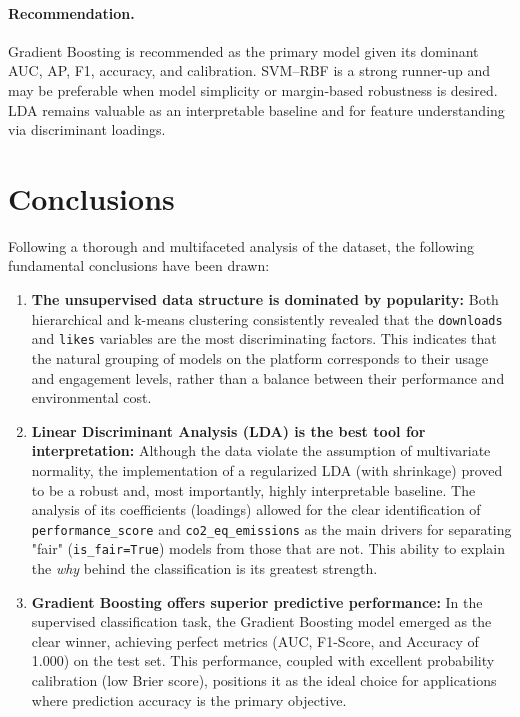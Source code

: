 \documentclass[journal]{IEEEtran}
\begin{document}
\paragraph{Recommendation.}
Gradient Boosting is recommended as the primary model given its dominant AUC, AP,
F1, accuracy, and calibration. SVM–RBF is a strong runner-up and may be preferable
when model simplicity or margin-based robustness is desired. LDA remains valuable
as an interpretable baseline and for feature understanding via discriminant loadings.
\section*{Conclusions}

Following a thorough and multifaceted analysis of the dataset, the following fundamental conclusions have been drawn:

\begin{enumerate}
	\item \textbf{The unsupervised data structure is dominated by popularity:} Both hierarchical and k-means clustering consistently revealed that the \texttt{downloads} and \texttt{likes} variables are the most discriminating factors. This indicates that the natural grouping of models on the platform corresponds to their usage and engagement levels, rather than a balance between their performance and environmental cost.
	
	\item \textbf{Linear Discriminant Analysis (LDA) is the best tool for interpretation:} Although the data violate the assumption of multivariate normality, the implementation of a regularized LDA (with shrinkage) proved to be a robust and, most importantly, highly interpretable baseline. The analysis of its coefficients (loadings) allowed for the clear identification of \texttt{performance\_score} and \texttt{co2\_eq\_emissions} as the main drivers for separating "fair" (\texttt{is\_fair=True}) models from those that are not. This ability to explain the \textit{why} behind the classification is its greatest strength.
	
	\item \textbf{Gradient Boosting offers superior predictive performance:} In the supervised classification task, the Gradient Boosting model emerged as the clear winner, achieving perfect metrics (AUC, F1-Score, and Accuracy of 1.000) on the test set. This performance, coupled with excellent probability calibration (low Brier score), positions it as the ideal choice for applications where prediction accuracy is the primary objective.
\end{enumerate}


	

	
\end{document}
